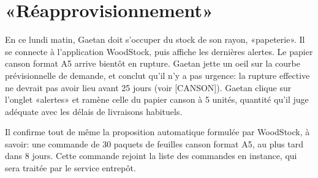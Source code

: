 \section{«Réapprovisionnement»}

En ce lundi matin, Gaetan doit s'occuper du stock de son rayon, «papeterie».
Il se connecte à l'application WoodStock, puis affiche les dernières alertes.
Le papier canson format A5 arrive bientôt en rupture.
Gaetan jette un oeil sur la courbe prévisionnelle de demande, et conclut qu'il n'y a pas urgence: la rupture effective ne devrait pas avoir lieu avant 25 jours (voir [CANSON]).
Gaetan clique sur l'onglet «alertes» et ramène celle du papier canson à 5 unités, quantité qu'il juge adéquate avec les délais de livraisons habituels.\par
Il confirme tout de même la proposition automatique formulée par WoodStock, à savoir: une commande de 30 paquets de feuilles canson format A5, au plus tard dans 8 jours.
Cette commande rejoint la liste des commandes en instance, qui sera traitée par le service entrepôt.
